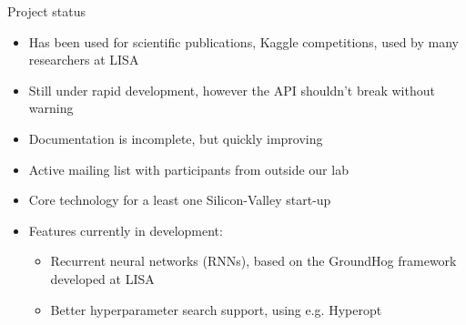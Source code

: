 \documentclass[utf8x,xcolor=pdftex,dvipsnames,table]{beamer}
\begin{document}
\begin{frame}{Project status}
  \begin{itemize}
    \item Has been used for scientific publications, Kaggle competitions, used by many researchers at LISA
    \item Still under rapid development, however the API shouldn't break without warning
    \item Documentation is incomplete, but quickly improving
    \item Active mailing list with participants from outside our lab
    \item Core technology for a least one Silicon-Valley start-up
    \item Features currently in development:
    \begin{itemize}
      \item Recurrent neural networks (RNNs), based on the GroundHog framework developed at LISA
      \item Better hyperparameter search support, using e.g. Hyperopt
    \end{itemize}
  \end{itemize}
\end{frame}


\end{document}
